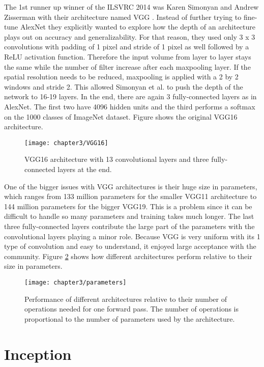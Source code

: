 The 1st runner up winner of the ILSVRC 2014 was Karen Simonyan and Andrew Zisserman with their architecture named VGG \cite{simonyan2014very}. Instead of further trying to fine-tune AlexNet they explicitly wanted to explore how the depth of an architecture plays out on accuracy and generalizability. For that reason, they used only 3 x 3 convolutions with padding of 1 pixel and stride of 1 pixel as well followed by a ReLU activation function. Therefore the input volume from layer to layer stays the same while the number of filter increase after each maxpooling layer. If the spatial resolution needs to be reduced, maxpooling is applied with a 2 by 2 windows and stride 2. This allowed Simonyan et al. to push the depth of the network to 16-19 layers. In the end, there are again 3 fully-connected layers as in AlexNet. The first two have 4096 hidden units and the third performs a softmax on the 1000 classes of ImageNet dataset. Figure shows the original VGG16 architecture.

\begin{figure}[H]
  \centering
  \caption{VGG16 architecture with 13 convolutional layers and three fully-connected layers at the end. \cite{ferguson2017automatic}}
  \texttt{[image: chapter3/VGG16]}
  \label{fig:vgg16}
\end{figure}

One of the bigger issues with VGG architectures is their huge size in parameters, which ranges from 133 million parameters for the smaller VGG11 architecture to 144 million parameters for the bigger VGG19. This is a problem since it can be difficult to handle so many parameters and training takes much longer. The last three fully-connected layers contribute the large part of the parameters with the convolutional layers playing a minor role. Because VGG is very uniform with its 1 type of convolution and easy to understand, it enjoyed large acceptance with the community. Figure \ref{fig:parameters} shows how different architectures perform relative to their size in parameters.

\begin{figure}[H]
  \centering
  \caption{Performance of different architectures relative to their number of operations needed for one forward pass. The number of operations is proportional to the number of parameters used by the architecture. \cite{canziani2016analysis}}
  \texttt{[image: chapter3/parameters]}
  \label{fig:parameters}
\end{figure}

\section{Inception}

